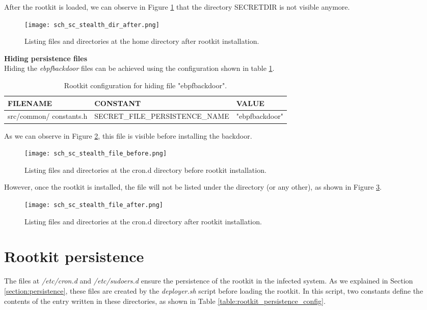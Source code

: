 After the rootkit is loaded, we can observe in Figure \ref{fig:sc_stealth_dir_after} that the directory SECRETDIR is not visible anymore.

\begin{figure}[htbp]
	\centering
	\texttt{[image: sch\_sc\_stealth\_dir\_after.png]}
	\caption{Listing files and directories at the home directory after rootkit installation.}
	\label{fig:sc_stealth_dir_after}
\end{figure}

\textbf{Hiding persistence files}\\
Hiding the \textit{ebpfbackdoor} files can be achieved using the configuration shown in table \ref{table:rootkit_stealth_config_file}.

\begin{table}[htbp]
\begin{tabular}{|>{\centering\arraybackslash}p{3cm}|>{\centering\arraybackslash}p{4.5cm}|>{\centering\arraybackslash}p{6cm}|}
\hline
\textbf{FILENAME} & \textbf{CONSTANT} & \textbf{VALUE}\\
\hline
\hline
src/common/ constants.h & SECRET\_FILE\_PERSISTENCE\_NAME & "ebpfbackdoor"\\
\hline
\end{tabular}
\caption{Rootkit configuration for hiding file "ebpfbackdoor".}
\label{table:rootkit_stealth_config_file}
\end{table}

As we can observe in Figure \ref{fig:sc_stealth_file_before}, this file is visible before installing the backdoor.

\begin{figure}[htbp]
	\centering
	\texttt{[image: sch\_sc\_stealth\_file\_before.png]}
	\caption{Listing files and directories at the cron.d directory before rootkit installation.}
	\label{fig:sc_stealth_file_before}
\end{figure}

However, once the rootkit is installed, the file will not be listed under the directory (or any other), as shown in Figure \ref{fig:sc_stealth_file_after}.

\begin{figure}[htbp]
	\centering
	\texttt{[image: sch\_sc\_stealth\_file\_after.png]}
	\caption{Listing files and directories at the cron.d directory after rootkit installation.}
	\label{fig:sc_stealth_file_after}
\end{figure}


\section{Rootkit persistence}
The files at \textit{/etc/cron.d} and \textit{/etc/sudoers.d} ensure the persistence of the rootkit in the infected system. As we explained in Section \ref{section:persistence}, these files are created by the \textit{deployer.sh} script before loading the rootkit. In this script, two constants define the contents of the entry written in these directories, as shown in Table \ref{table:rootkit_persistence_config}.

